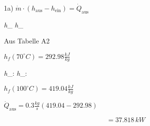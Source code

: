 1a) $\dot{m} \cdot (h_{\text{aus}} - h_{\text{ein}}) = \dot{Q}_{\text{aus}}$

\textit{h}_{} \textit{h}_{}

Aus Tabelle A2

$h_f(70^\circ C) = 292.98 \frac{kJ}{kg}$

\textit{h}_{}: \textit{h}_{}:

$h_f(100^\circ C) = 419.04 \frac{kJ}{kg}$

$\dot{Q}_{\text{aus}} = 0.3 \frac{kg}{s} (419.04 - 292.98)$

\[
= 37.818 \, kW
\]